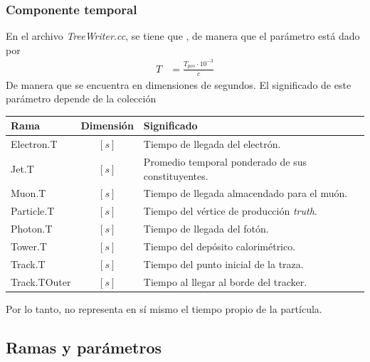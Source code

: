         \subsubsection{Componente temporal}
        En el archivo \textit{TreeWriter.cc}, se tiene que , de manera que el parámetro  está dado por
        \begin{equation*}
            \begin{aligned}
                T & = \frac{T_{pos} \cdot 10^{-3}}{c}
            \end{aligned}
        \end{equation*}
        De manera que  se encuentra en dimensiones de segundos. El significado de este parámetro depende de la colección
        \begin{table}[H]
            \begin{center}
                \begin{tabular}{|l|c|l|}\hline
                    \textbf{Rama} & \textbf{Dimensión} & \textbf{Significado} \\\hline\hline
                    Electron.T & $[s]$ & Tiempo de llegada del electrón. \\\hline
                    Jet.T & $[s]$ & Promedio temporal ponderado de sus constituyentes. \\\hline
                    Muon.T & $[s]$ & Tiempo de llegada almacendado para el muón. \\\hline
                    Particle.T & $[s]$ & Tiempo del vértice de producción \textit{truth}. \\\hline
                    Photon.T & $[s]$ & Tiempo de llegada del fotón. \\\hline
                    Tower.T & $[s]$ & Tiempo del depósito calorimétrico. \\\hline
                    Track.T & $[s]$ & Tiempo del punto inicial de la traza. \\\hline
                    Track.TOuter & $[s]$ & Tiempo al llegar al borde del tracker. \\\hline
                \end{tabular}
            \end{center}
        \end{table}
        Por lo tanto,  no representa en sí mismo el tiempo propio de la partícula.

    \subsection{Ramas y parámetros}
